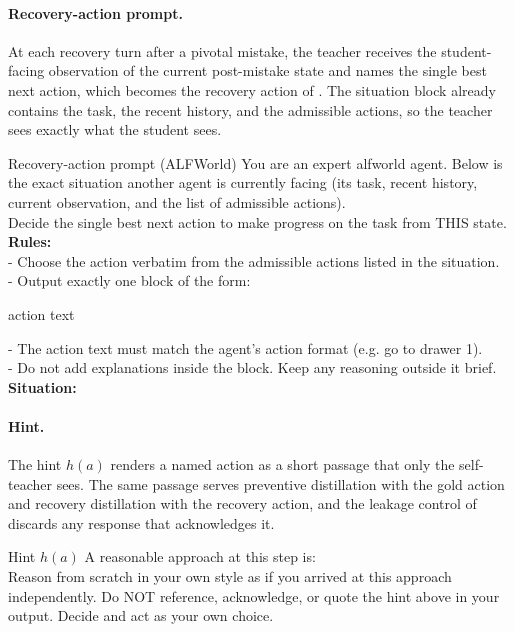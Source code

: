 \paragraph{Recovery-action prompt.} At each recovery turn after a pivotal mistake, the teacher receives the student-facing observation of the current post-mistake state and names the single best next action, which becomes the recovery action of . The situation block already contains the task, the recent history, and the admissible actions, so the teacher sees exactly what the student sees.

\begin{promptbox}{Recovery-action prompt (ALFWorld)}
You are an expert alfworld agent. Below is the exact situation another agent is currently facing (its task, recent history, current observation, and the list of admissible actions).\\[5pt]
Decide the single best next action to make progress on the task from THIS state.
\promptsep
\textbf{Rules:}\\
- Choose the action verbatim from the admissible actions listed in the situation.\\
- Output exactly one block of the form:
\begin{promptcard}
action text
\end{promptcard}
- The action text must match the agent's action format (e.g. go to drawer 1).\\
- Do not add explanations inside the block. Keep any reasoning outside it brief.
\promptsep
\textbf{Situation:}\\
\end{promptbox}

\paragraph{Hint.} The hint $h(a)$ renders a named action as a short passage that only the self-teacher sees. The same passage serves preventive distillation with the gold action and recovery distillation with the recovery action, and the leakage control of  discards any response that acknowledges it.

\begin{promptbox}{Hint $h(a)$}
A reasonable approach at this step is: \\[3pt]
Reason from scratch in your own style as if you arrived at this approach independently. Do NOT reference, acknowledge, or quote the hint above in your output. Decide and act as your own choice.
\end{promptbox}

